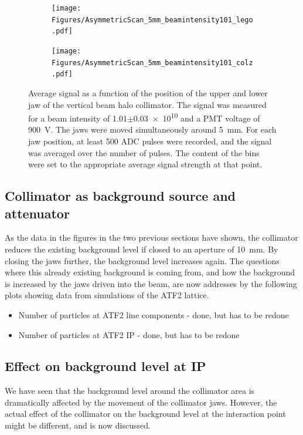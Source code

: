\begin{figure}
\begin{subfigure}[b]{0.5\textwidth}
\texttt{[image: Figures/AsymmetricScan\_5mm\_beamintensity101\_lego.pdf]}
\end{subfigure}
\begin{subfigure}[b]{0.5\textwidth}
\texttt{[image: Figures/AsymmetricScan\_5mm\_beamintensity101\_colz.pdf]}
\end{subfigure}
\caption[RHUL Cherenkov detector signal for certain upper/lower jaw positions around \SI{5}{\milli\metre}, for a beam intensity of \num{1.01}$\pm$\num{0.03e10}]{Average signal as a function of the position of the upper and lower jaw of the vertical beam halo collimator. The signal was measured for a beam intensity of \num{1.01}$\pm$\num{0.03e10} and a PMT voltage of \SI{900}{\volt}. The jaws were moved simultaneously around \SI{5}{\milli\metre}. For each jaw position, at least 500 ADC pulses were recorded, and the signal was averaged over the number of pulses. The content of the bins were set to the appropriate average signal strength at that point.}
\label{fig:AverageSignal_Asymmetric_5mm_101}
\end{figure}
\subsection{Collimator as background source and attenuator}
\label{sec:BDSIM_sim}
As the data in the figures in the two previous sections have shown, the collimator reduces the existing background level if closed to an aperture of \SI{10}{\milli\metre}. By closing the jaws further, the background level increases again. The questions where this already existing background is coming from, and how the background is increased by the jaws driven into the beam, are now addresses by the following plots showing data from \bdsim simulations of the ATF2 lattice.

\begin{itemize}
 \item Number of particles at ATF2 line components - done, but has to be redone
 \item Number of particles at ATF2 IP - done, but has to be redone
\end{itemize}

\subsection{Effect on background level at IP}
\label{collimator_bkg_IP}
We have seen that the background level around the collimator area is dramatically affected by the movement of the collimator jaws. However, the actual effect of the collimator on the background level at the interaction point might be different, and is now discussed.

